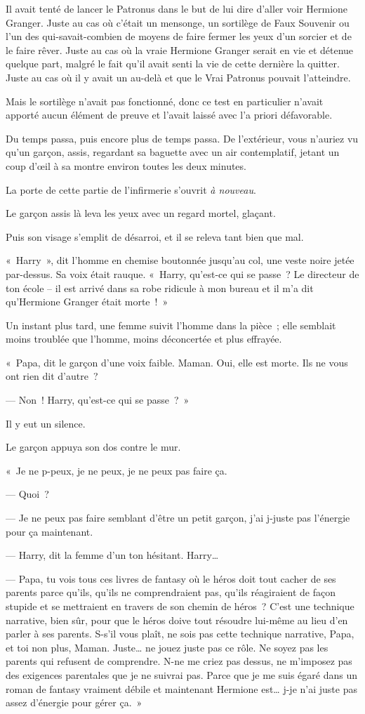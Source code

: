 Il avait tenté de lancer le Patronus dans le but de lui dire d'aller voir Hermione Granger.
Juste au cas où c'était un mensonge, un sortilège de Faux Souvenir ou l'un des qui-savait-combien de moyens de faire fermer les yeux d'un sorcier et de le faire rêver.
Juste au cas où la vraie Hermione Granger serait en vie et détenue quelque part, malgré le fait qu'il avait senti la vie de cette dernière la quitter.
Juste au cas où il y avait un au-delà et que le Vrai Patronus pouvait l'atteindre.

Mais le sortilège n'avait pas fonctionné, donc ce test en particulier n'avait apporté aucun élément de preuve et l'avait laissé avec l'a priori défavorable.

Du temps passa, puis encore plus de temps passa.
De l'extérieur, vous n'auriez vu qu'un garçon, assis, regardant sa baguette avec un air contemplatif, jetant un coup d'œil à sa montre environ toutes les deux minutes.

La porte de cette partie de l'infirmerie s'ouvrit \emph{à nouveau}.

Le garçon assis là leva les yeux avec un regard mortel, glaçant.

Puis son visage s'emplit de désarroi, et il se releva tant bien que mal.

«~Harry~», dit l'homme en chemise boutonnée jusqu'au col, une veste noire jetée par-dessus.
Sa voix était rauque.
«~Harry, qu'est-ce qui se passe~?
Le directeur de ton école -- il est arrivé dans sa robe ridicule à mon bureau et il m'a dit qu'Hermione Granger était morte~!~»

Un instant plus tard, une femme suivit l'homme dans la pièce~; elle semblait moins troublée que l'homme, moins déconcertée et plus effrayée.

«~Papa, dit le garçon d'une voix faible.
Maman. Oui, elle est morte.
Ils ne vous ont rien dit d'autre~?

--- Non~!
Harry, qu'est-ce qui se passe~?~»

Il y eut un silence.

Le garçon appuya son dos contre le mur.

«~Je ne p-peux, je ne peux, je ne peux pas faire ça.

--- Quoi~?

--- Je ne peux pas faire semblant d'être un petit garçon, j'ai j-juste pas l'énergie pour ça maintenant.

--- Harry, dit la femme d'un ton hésitant.
Harry…

--- Papa, tu vois tous ces livres de fantasy où le héros doit tout cacher de ses parents parce qu'ils, qu'ils ne comprendraient pas, qu'ils réagiraient de façon stupide et se mettraient en travers de son chemin de héros~?
C'est une technique narrative, bien sûr, pour que le héros doive tout résoudre lui-même au lieu d'en parler à ses parents.
S-s'il vous plaît, ne sois pas cette technique narrative, Papa, et toi non plus, Maman.
Juste… ne jouez juste pas ce rôle.
Ne soyez pas les parents qui refusent de comprendre.
N-ne me criez pas dessus, ne m'imposez pas des exigences parentales que je ne suivrai pas.
Parce que je me suis égaré dans un roman de fantasy vraiment débile et maintenant Hermione est… j-je n'ai juste pas assez d'énergie pour gérer ça.~»

